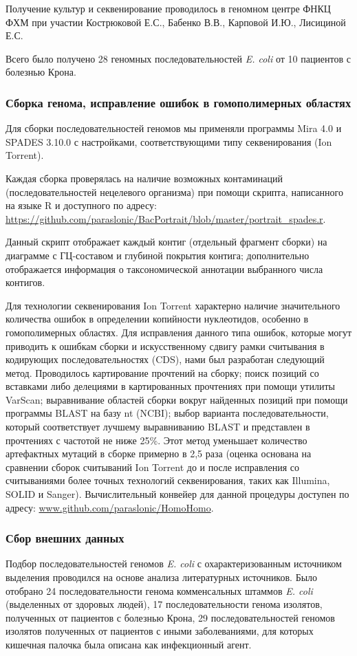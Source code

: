 Получение культур и секвенирование проводилось в геномном центре ФНКЦ ФХМ при участии Кострюковой Е.С., Бабенко В.В., Карповой И.Ю., Лисициной Е.С.

Всего было получено 28 геномных последовательностей \textit{E. coli} от 10 пациентов с болезнью Крона.

\subsubsection*{Сборка генома, исправление ошибок в гомополимерных областях}
Для сборки последовательностей геномов мы применяли программы Mira 4.0 и SPADES 3.10.0 с настройками, соответствующими типу секвенирования (Ion Torrent).

Каждая сборка проверялась на наличие возможных контаминаций (последовательностей нецелевого организма) при помощи скрипта, написанного на языке R и доступного по адресу: \url{https://github.com/paraslonic/BacPortrait/blob/master/portrait\_spades.r}. 

Данный скрипт отображает каждый контиг (отдельный фрагмент сборки) на диаграмме с ГЦ-составом и глубиной покрытия контига; дополнительно отображается информация о таксономической аннотации выбранного числа контигов. 

Для технологии секвенирования Ion Torrent характерно наличие значительного количества ошибок в определении копийности нуклеотидов, особенно в гомополимерных областях. Для исправления данного типа ошибок, которые могут приводить к ошибкам сборки и искусственному сдвигу рамки считывания в кодирующих последовательностях (CDS), нами был разработан следующий метод. Проводилось картирование прочтений на сборку; поиск позиций со вставками либо делециями в картированных прочтениях при помощи утилиты VarScan; выравнивание областей сборки вокруг найденных позиций при помощи программы BLAST на базу nt (NCBI); выбор варианта последовательности, который соответствует лучшему выравниванию BLAST и представлен в прочтениях с частотой не ниже 25\%. Этот метод уменьшает количество артефактных мутаций в сборке примерно в 2,5 раза (оценка основана на сравнении сборок считываний Ion Torrent до и после исправления со считываниями более точных технологий секвенирования, таких как Illumina, SOLID и Sanger). Вычислительный конвейер для данной процедуры доступен по адресу: \url{www.github.com/paraslonic/HomoHomo}.


\subsubsection{Сбор внешних данных}
Подбор последовательностей геномов \textit{E. coli} с охарактеризованным источником выделения проводился на основе анализа литературных источников. Было отобрано 24 последовательности генома комменсальных штаммов \textit{E. coli} (выделенных от здоровых людей), 17 последовательности генома изолятов, полученных от пациентов с болезнью Крона, 29 последовательностей геномов изолятов полученных от пациентов с иными заболеваниями, для которых кишечная палочка была описана как инфекционный агент.

